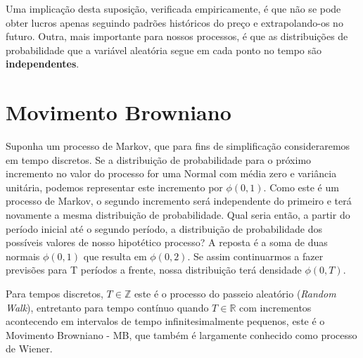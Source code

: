 \documentclass[]{book}
\begin{document}
Uma implicação desta suposição, verificada empiricamente, é que não se
pode obter lucros apenas seguindo padrões históricos do preço e
extrapolando-os no futuro. Outra, mais importante para nossos processos,
é que as distribuições de probabilidade que a variável aleatória segue
em cada ponto no tempo são \textbf{independentes}.

\section{Movimento Browniano}\label{mb}

Suponha um processo de Markov, que para fins de simplificação
consideraremos em tempo discretos. Se a distribuição de probabilidade
para o próximo incremento no valor do processo for uma Normal com média
zero e variância unitária, podemos representar este incremento por
\(\phi(0, 1)\). Como este é um processo de Markov, o segundo incremento
será independente do primeiro e terá novamente a mesma distribuição de
probabilidade. Qual seria então, a partir do período inicial até o
segundo período, a distribuição de probabilidade dos possíveis valores
de nosso hipotético processo? A reposta é a soma de duas normais
\(\phi(0, 1)\) que resulta em \(\phi(0, 2)\). Se assim continuarmos a
fazer previsões para T períodos a frente, nossa distribuição terá
densidade \(\phi(0, T)\).

Para tempos discretos, \(T\in\mathbb{Z}\) este é o processo do passeio
aleatório (\emph{Random Walk}), entretanto para tempo contínuo quando
\(T\in\mathbb{R}\) com incrementos acontecendo em intervalos de tempo
infinitesimalmente pequenos, este é o Movimento Browniano - MB, que
também é largamente conhecido como processo de Wiener.
\end{document}
